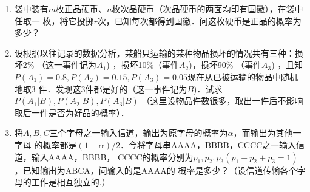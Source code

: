 \begin{enumerate}
    \item 袋中装有$m$枚正品硬币、$n$枚次品硬币（次品硬币的两面均印有国徽），在袋中任取一
    枚，将它投掷$r$次，已知每次都得到国徽．问这枚硬币是正品的概率为多少？


    \item 设根据以往记录的数据分析，某船只运输的某种物品损坏的情况共有三种：损坏2\%
    （这一事件记为$A_1$) ，损坏10\%（事件$A_2$)，损坏90\% （事件$A_3$) ，且知
    $P(A_1)=0.8,P(A_2)=0.15,P(A_3)=0.05$现在从已被运输的物品中随机地取3
    件．发现这3件都是好的（这一事件记为$B$)．试求$P(A_1|B),P(A_2|B),P(A_3|B)$
     （这里设物品件数很多，取出一件后不影响取后一件是否为好品的概率）．


     \item 将$A,B,C$三个字母之一输入信道，输出为原字母的概率为$\alpha$，而输出为其他一字母
     的概率都是$(1-\alpha)/2$．今将字母串AAAA，BBBB，CCCC之一输入信道，输入AAAA，BBBB，
     CCCC的概率分别为$p_1,p_2,p_3(p_1+p_2+p_3=1)$，已知输出为ABCA，问输入的是AAAA的
     概率是多少？（设信道传输各个字母的工作是相互独立的.）

\end{enumerate}
